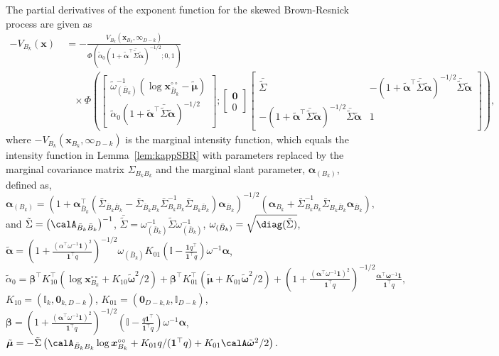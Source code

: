 \documentclass[12pt]{article}
\begin{document}
\begin{lemma}\label{lem:partial_BR}
The partial derivatives of the exponent function for the skewed Brown-Resnick process are given as
\begin{align*}
-V_{B_k}(\bm x) &\ =  - \frac{V_{B_k}(\bm x_{B_k},\bm \infty_{D-k})}{\Phi\left(\tilde\alpha_0\left(1+\tilde{\bm\alpha}^\top\bar{\tilde\Sigma}\tilde{\bm\alpha}\right)^{-1/2}; 0, 1\right)} \\
& \quad \times 
\Phi\left(
\begin{bmatrix} 
\tilde\omega^{-1}_{(\bar B_k)}(\log \bm x_{\bar B_k}^{\circ\circ} - \tilde{\bm\mu})  \\
\tilde\alpha_0(1+\tilde{\bm\alpha}^\top\bar{\tilde\Sigma}\tilde{\bm\alpha})^{-1/2}
\end{bmatrix};
\begin{bmatrix}
\bm 0 \\ 0
\end{bmatrix}
\begin{bmatrix}
	\bar{\tilde\Sigma} & -(1+\tilde{\bm\alpha}^\top\bar{\tilde\Sigma}\tilde{\bm\alpha})^{-1/2}\bar{\tilde\Sigma}\tilde{\bm\alpha} \\
-(1+\tilde{\bm\alpha}^\top\bar{\tilde\Sigma}\tilde{\bm\alpha})^{-1/2}\bar{\tilde\Sigma}\tilde{\bm\alpha} &	1
\end{bmatrix} 
\right), 
\end{align*}
where $-V_{B_k}(\bm x_{B_k}, \bm \infty_{D-k})$ is the marginal intensity function, which equals the intensity function in Lemma~\ref{lem:kappSBR} with parameters replaced by the marginal covariance matrix $\Sigma_{B_kB_k}$ and the marginal slant parameter, $\bm\alpha_{(B_k)}$, defined as, 
$$\bm\alpha_{(B_k)} = \left(1+\bm\alpha_{\bar B_k}^\top\left(\bar\Sigma_{\bar B_k\bar B_k} -\bar \Sigma_{\bar B_k B_k}\bar\Sigma_{B_kB_k}^{-1}\bar\Sigma_{B_k\bar B_k}\right)\bm \alpha_{\bar B_k}\right)^{-1/2}\left(\bm \alpha_{B_k} + \bar\Sigma_{B_kB_k}^{-1}\bar\Sigma_{B_k\bar B_k}\bm\alpha_{\bar B_k}\right),$$
and
$\tilde\Sigma = \left(\calA_{\bar B_k\bar B_k}\right)^{-1}$, 
$\bar{\tilde\Sigma} = \omega_{(\bar B_k)}^{-1}\tilde\Sigma\omega_{(\bar B_k)}^{-1}$, $\omega_{(\bar B_k)}=\sqrt{\diag(\tilde\Sigma)}$,
$\tilde{\bm\alpha}=\left(1 + \frac{\left(\alpha^\top\omega^{-1}\bm 1\right)^2}{\bm 1^\top q}\right)^{-1/2}\omega_{(\bar B_k)} K_{01}\left(\mathbb{I} - \frac{\bm 1 q^\top}{\bm 1^\top q}\right)\omega^{-1}\bm\alpha$,
$\tilde\alpha_0 = \bm\beta^\top K_{10}^\top(\log \bm x_{B_k}^{\circ\circ}+K_{10}\tilde{\bm\omega}^2/2) + \bm\beta^\top K_{01}^\top(\tilde{\bm\mu} + K_{01}\tilde{\bm\omega}^2/2) +  \left(1 + \frac{(\bm\alpha^\top\omega^{-1}\bm 1)^2}{\bm 1^\top q}\right)^{-1/2}\frac{\bm\alpha^\top\bm\omega^{-1}\bm 1}{\bm 1^\top q},$ 
$K_{10} = (\mathbb I_{k},\bm 0_{k,D-k})$, 
$K_{01} = (\bm 0_{D-k,k},\mathbb I_{D-k})$, 
$\bm\beta = \left(1 + \frac{(\bm\alpha^\top\omega^{-1}\bm 1)^2}{\bm 1^\top q}\right)^{-1/2}\left(\mathbb I - \frac{q\bm 1^\top}{\bm 1^\top q}\right)\omega^{-1}\bm\alpha$, $\tilde{\bm\mu} = -\tilde\Sigma\left(\calA_{\bar B_kB_k}\log \bm x_{B_k}^{\circ\circ} + K_{01}q/(\bm 1^\top q)+K_{01}\calA\tilde{\bm\omega}^2/2\right).$
\end{lemma}
\end{document}
